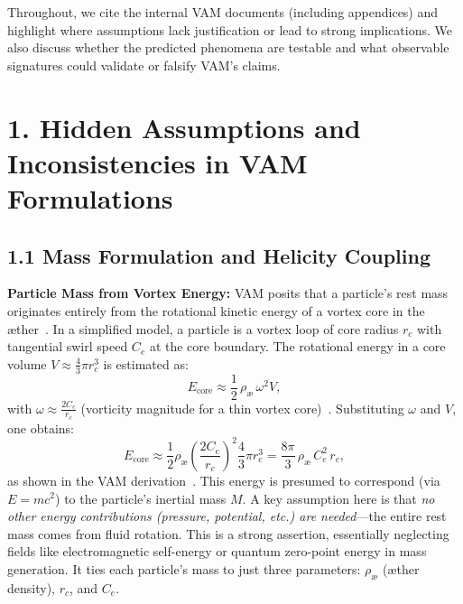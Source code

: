\documentclass[a4paper,12pt]{article}
\begin{document}
Throughout, we cite the internal VAM documents (including appendices) and highlight where assumptions lack justification or lead to strong implications. We also discuss whether the predicted phenomena are testable and what observable signatures could validate or falsify VAM’s claims.

\section*{1. Hidden Assumptions and Inconsistencies in VAM Formulations}

\subsection*{1.1 Mass Formulation and Helicity Coupling}

    \textbf{Particle Mass from Vortex Energy:} VAM posits that a particle’s rest mass originates entirely from the rotational kinetic energy of a vortex core in the æther~\cite{vamcore}. In a simplified model, a particle is a vortex loop of core radius $r_c$ with tangential swirl speed $C_e$ at the core boundary. The rotational energy in a core volume $V \approx \tfrac{4}{3}\pi r_c^3$ is estimated as:
    \begin{equation}
        E_{\text{core}} \approx \frac{1}{2}\,\rho_{\text{\ae}}\,\omega^2 V,
    \end{equation}
    with $\omega \approx \frac{2C_e}{r_c}$ (vorticity magnitude for a thin vortex core)~\cite{vamcore}. Substituting $\omega$ and $V$, one obtains:
    \begin{equation}
        E_{\text{core}} \approx \frac{1}{2}\rho_{\text{\ae}}\left(\frac{2C_e}{r_c}\right)^2 \frac{4}{3}\pi r_c^3 = \frac{8\pi}{3}\,\rho_{\text{\ae}}\,C_e^2\,r_c,
    \end{equation}
    as shown in the VAM derivation~\cite{vamcore}. This energy is presumed to correspond (via $E=mc^2$) to the particle’s inertial mass $M$. A key assumption here is that \emph{no other energy contributions (pressure, potential, etc.) are needed}---the entire rest mass comes from fluid rotation. This is a strong assertion, essentially neglecting fields like electromagnetic self-energy or quantum zero-point energy in mass generation. It ties each particle’s mass to just three parameters: $\rho_{\text{\ae}}$ (æther density), $r_c$, and $C_e$.
\end{document}
